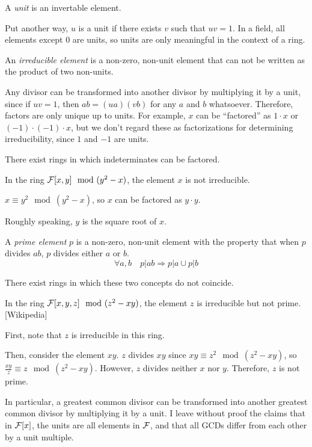 \begin{key point}
A {\it unit} is an invertable element.
\end{key point}

Put another way, $u$ is a unit if there exists $v$ such that $uv=1$.
In a field, all elements except 0 are units, so units are only
meaningful in the context of a ring.

\begin{key point}
An {\it irreducible element} is a non-zero, non-unit element
that can not be written as the product of two non-units.
\end{key point}

Any divisor can be transformed into another divisor by multiplying it
by a unit, since if $uv=1$, then $ab=(ua)(vb)$ for any $a$ and $b$
whatsoever.  Therefore, factors are only unique up to units.  For
example, $x$ can be ``factored'' as $1 \cdot x$ or $(-1)\cdot(-1)\cdot x$,
but we don't regard these as factorizations for
determining irreducibility, since $1$ and $-1$ are units.

There exist rings in which indeterminates can be factored.

\example
In the ring ${\cal F}[x,y] \mod (y^2-x)$, the element $x$ is
not irreducible.

$x \equiv y^2 \mod (y^2-x)$, so $x$ can be factored as
$y\cdot y$.

Roughly speaking, $y$ is the square root of $x$.
\endexample

\begin{key point}
A {\it prime element} $p$ is a non-zero, non-unit element with
the property that when $p$ divides $ab$, $p$ divides either $a$ or $b$.
$$\forall a,b \quad p|ab \Rightarrow p|a \cup p|b$$
\end{key point}

There exist rings in which these two concepts do not coincide.

\example
In the ring ${\cal F}[x,y,z] \mod (z^2-xy)$, the element $z$ is
irreducible but not prime.  [Wikipedia]

First, note that $z$ is irreducible in this ring.

Then, consider the element $xy$.  $z$ divides $xy$ since
$xy \equiv z^2 \mod (z^2-xy)$, so $\frac{xy}{z} \equiv z \mod (z^2-xy)$.
However, $z$ divides neither $x$ nor $y$.
Therefore, $z$ is not prime.
\endexample



In particular, a greatest common divisor can be transformed into
another greatest common divisor by multiplying it by a unit.  I leave
without proof the claims that in ${\cal F}[x]$, the units are all
elements in ${\cal F}$, and that all GCDs differ from each other by a
unit multiple.

